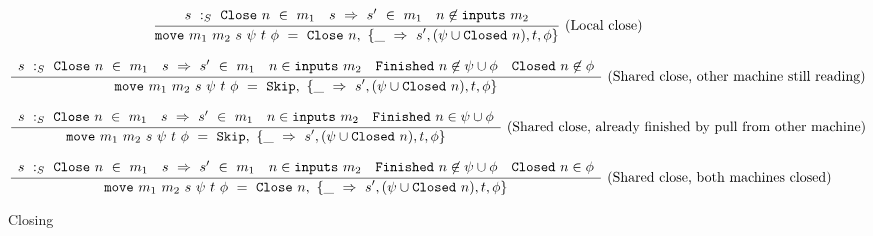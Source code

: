 \begin{figure*}

$$
\ruleI
{
    \arrLCR
        { \CheckStateTypeM{m_1}{s}{\Close{n}} }
        { \TransUM{s}{s'}{m_1} }
        { n \not\in \inputs{m_2} }
}
{
    \MoveOut
        {\sptp}
        {\Close{n}}
        {\MoveTU{s',(\psi \cup \Closed{n}), t, \phi}}
}
\textrm{(Local close)}
$$

$$
\ruleI
{
    \arrLCCCR
        { \CheckStateTypeM{m_1}{s}{\Close{n}} }
        { \TransUM{s}{s'}{m_1} }
        { n \in \inputs{m_2} }
        { \Finished{n} \not\in \psi \cup \phi }
        { \Closed{n} \not\in \phi             }
}
{
    \MoveOut
        {\sptp}
        {\Skip}
        {\MoveTU{s',(\psi \cup \Closed{n}), t, \phi}}
}
\textrm{(Shared close, other machine still reading)}
$$

$$
\ruleI
{
    \arrLCCR
        { \CheckStateTypeM{m_1}{s}{\Close{n}} }
        { \TransUM{s}{s'}{m_1} }
        { n \in \inputs{m_2} }
        { \Finished{n} \in \psi \cup \phi }
}
{
    \MoveOut
        {\sptp}
        {\Skip}
        {\MoveTU{s',(\psi \cup \Closed{n}), t, \phi}}
}
\textrm{(Shared close, already finished by pull from other machine)}
$$

$$
\ruleI
{
    \arrLCCCR
        { \CheckStateTypeM{m_1}{s}{\Close{n}} }
        { \TransUM{s}{s'}{m_1} }
        { n \in \inputs{m_2} }
        { \Finished{n} \not\in \psi \cup \phi }
        { \Closed{n} \in \phi             }
}
{
    \MoveOut
        {\sptp}
        {\Close{n}}
        {\MoveTU{s',(\psi \cup \Closed{n}), t, \phi}}
}
\textrm{(Shared close, both machines closed)}
$$


\caption{Closing}
\label{fig:merge:gen:noninter}
\end{figure*}

